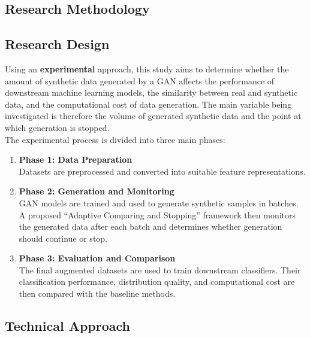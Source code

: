\documentclass[12pt,a4paper]{report}
\begin{document}
\begin{justify}
\chapter{Research Methodology}

\section{Research Design}
Using an \textbf{experimental} approach, this study aims to determine whether the amount of synthetic data generated by a GAN affects the performance of downstream machine learning models, the similarity between real and synthetic data, and the computational cost of data generation. The main variable being investigated is therefore the volume of generated synthetic data and the point at which generation is stopped.\\

\noindent The experimental process is divided into three main phases:

\begin{enumerate}
    \item \textbf{Phase 1: Data Preparation} \\
    \noindent Datasets are preprocessed and converted into suitable feature representations.
    \item \textbf{Phase 2: Generation and Monitoring} \\ 
    \noindent GAN models are trained and used to generate synthetic samples in batches. A proposed ``Adaptive Comparing and Stopping'' framework then monitors the generated data after each batch and determines whether generation should continue or stop.
    \item \textbf{Phase 3: Evaluation and Comparison} \\
    The final augmented datasets are used to train downstream classifiers. Their classification performance, distribution quality, and computational cost are then compared with the baseline methods.
\end{enumerate}

\section{Technical Approach}


\end{justify}
\end{document}

